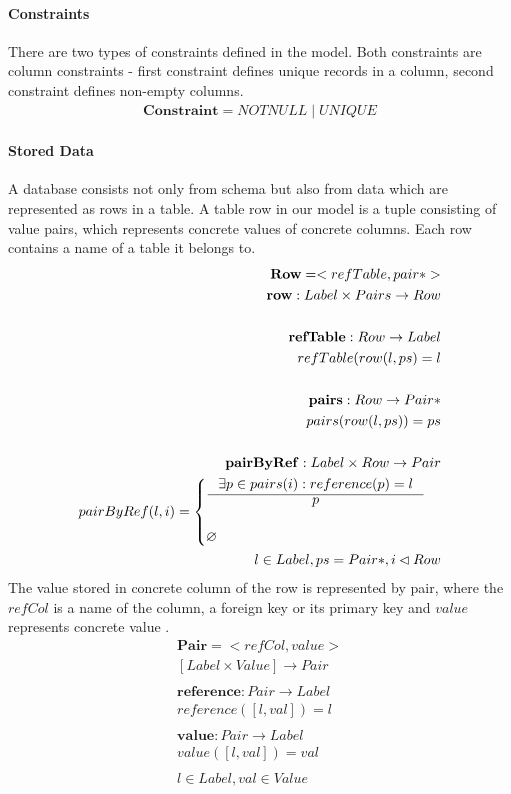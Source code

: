 \documentclass[11pt]{article}
\begin{document}
\paragraph{Constraints} There are two types of constraints defined in the model. Both constraints are column constraints - first constraint defines unique records in a column, second constraint defines non-empty columns.
\begin{align*}
	\mathbf{Constraint} = NOTNULL \; | \; UNIQUE 
\end{align*}


\paragraph{Stored Data} A database consists not only from schema but also from data which are represented as rows in a table. A table row in our model is a tuple consisting of value pairs, which represents concrete values of concrete columns. Each row contains a name of a table it belongs to.
\begin{align*}
	\mathbf{Row} = < refTable, pair* > \\
	\mathbf{row} : Label \times Pairs \rightarrow Row \\ \\
	\mathbf{refTable} : Row \rightarrow Label \\
	refTable(row(l, ps) = l \\ \\
	\mathbf{pairs} : Row \rightarrow Pair* \\
	pairs(row(l, ps)) = ps \\ \\
	\mathbf{pairByRef} : Label \times Row \rightarrow Pair \\
	pairByRef(l,i) = \begin{cases}
		\inference{\exists p \in pairs(i) : reference(p) = l}{p} \\ \\
			\varnothing
		\end{cases}\\
	 l \in Label, ps = Pair*, i \lhd Row
\end{align*}
The value stored in concrete column of the row is represented by pair, where the $refCol$ is a name of the column, a foreign key or its primary key and $value$ represents concrete value .
\begin{align*}
	\mathbf{Pair} = < refCol, value > \\
	[Label \times Value] \rightarrow Pair\\ \\
	\mathbf{reference} : Pair \rightarrow Label \\
	reference([l,val]) = l \\ \\
	\mathbf{value} : Pair \rightarrow Label \\ 
	value([l,val]) = val \\ \\
	l \in Label, val \in Value
\end{align*}
\end{document}
